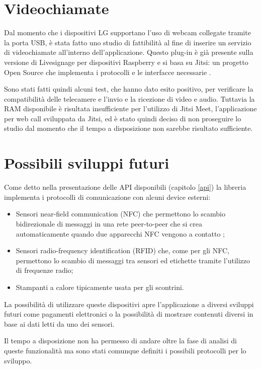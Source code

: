 \section{Videochiamate}

Dal momento che i dispositivi LG supportano l'uso di webcam collegate tramite la porta USB, è stata fatto uno studio di fattibilità al fine di inserire un servizio di videochiamate all'interno dell'applicazione.
Questo plug-in è già presente sulla versione di Livesignage per dispositivi Raspberry e si basa su Jitsi: un progetto Open Source che implementa i protocolli e le interfacce necessarie \cite{jitsi}.

Sono stati fatti quindi alcuni test, che hanno dato esito positivo, per verificare la compatibilità delle telecamere e l'invio e la ricezione di video e audio. Tuttavia la RAM disponibile è risultata insufficiente per l'utilizzo di Jitsi Meet, l'applicazione per web call sviluppata da Jitsi, ed è stato quindi deciso di non proseguire lo studio dal momento che il tempo a disposizione non sarebbe risultato sufficiente.

\section{Possibili sviluppi futuri} \label{future_implementazioni}

Come detto nella presentazione delle API disponibili (capitolo \ref*{api}) la libreria  implementa i protocolli di comunicazione con alcuni device esterni:
\begin{itemize}
    \item Sensori near-field communication (NFC) che permettono lo scambio bidirezionale di messaggi in una rete peer-to-peer che si crea automaticamente quando due apparecchi NFC vengono a contatto \cite{nfc};
    \item Sensori radio-frequency identification (RFID) che, come per gli NFC, permettono lo scambio di messaggi tra sensori ed etichette tramite l'utilizzo di frequenze radio;
    \item Stampanti a calore tipicamente usata per gli scontrini. 
\end{itemize}

La possibilità di utilizzare queste dispositivi apre l'applicazione a diversi sviluppi futuri come pagamenti elettronici o la possibilità di mostrare contenuti diversi in base ai dati letti da uno dei sensori.

Il tempo a disposizione non ha permesso di andare oltre la fase di analisi di queste funzionalità ma sono stati comunque definiti i possibili protocolli per lo sviluppo.
